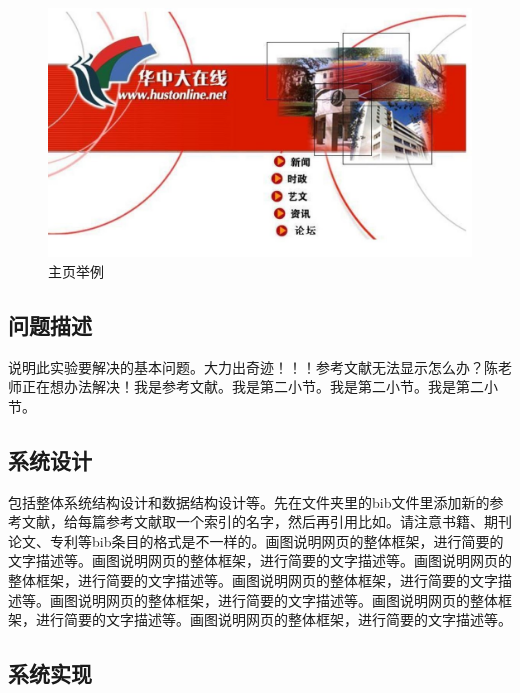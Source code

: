 \documentclass[supercite]{Experimental_Report}
\theoremstyle{definition}
\begin{document}
\begin{figure}[htb]
	\begin{center}
		\includegraphics[scale=0.40]{images/2-1.jpg}
		\caption{主页举例}
		\label{fig2-1}
	\end{center}
\end{figure}

\subsection{问题描述}

说明此实验要解决的基本问题。大力出奇迹！！！参考文献无法显示怎么办？陈老师正在想办法解决\cite{STR2021Neurocom, AVS2021Neurocom}！我是参考文献。我是第二小节\cite{Mehrabian1974An}。我是第二小节\cite{Rezaei2014CVPR}。我是第二小节\cite{Ramnath2008IJCV}。

\subsection{系统设计}

包括整体系统结构设计和数据结构设计等。先在文件夹里的bib文件里添加新的参考文献，给每篇参考文献取一个索引的名字，然后再引用比如\cite{STR2021Neurocom}\cite{AVS2021Neurocom, Rezaei2014CVPR}。请注意书籍、期刊论文、专利等bib条目的格式是不一样的。画图说明网页的整体框架，进行简要的文字描述等。画图说明网页的整体框架，进行简要的文字描述等。画图说明网页的整体框架，进行简要的文字描述等。画图说明网页的整体框架，进行简要的文字描述等。画图说明网页的整体框架，进行简要的文字描述等。画图说明网页的整体框架，进行简要的文字描述等。画图说明网页的整体框架，进行简要的文字描述等。

\subsection{系统实现}
\end{document}
